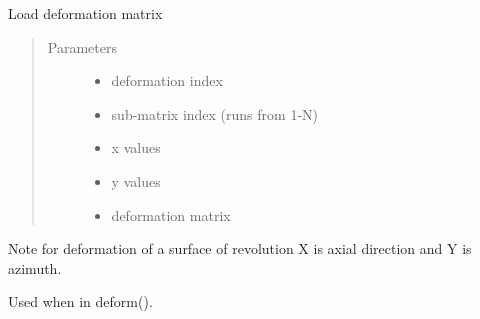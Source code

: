\documentclass[letterpaper,10pt,english]{sphinxmanual}
\begin{document}
\begin{fulllineitems}
\label{\detokenize{xsrt_functions:xsrt.defmat}}
Load deformation matrix
\begin{quote}\begin{description}
\item[{Parameters}] \leavevmode\begin{itemize}
\item {} 
 \textendash{} deformation index

\item {} 
 \textendash{} sub-matrix index (runs from 1-N)

\item {} 
 \textendash{} x values

\item {} 
 \textendash{} y values

\item {} 
 \textendash{} deformation matrix

\end{itemize}

\end{description}\end{quote}

Note for deformation of a surface of revolution X is axial direction and
Y is azimuth.

Used when  in deform().

\end{fulllineitems}

\end{document}
